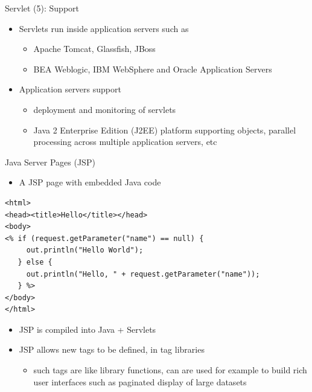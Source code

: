 \documentclass[aspectratio=169, xcolor=dvipsnames]{beamer}
\begin{document}
\begin{frame}{Servlet (5): Support}
    \begin{itemize}[<+->]
        \item Servlets run inside application servers such as
        \begin{itemize}
            \item[$\triangleright$] Apache Tomcat, Glassfish, JBoss
            \item[$\triangleright$] BEA Weblogic, IBM WebSphere and Oracle Application Servers
        \end{itemize}
        \item Application servers support
        \begin{itemize}
            \item[$\triangleright$] deployment and monitoring of servlets
            \item[$\triangleright$] Java 2 Enterprise Edition (J2EE) platform supporting objects, parallel processing across multiple application servers, etc
        \end{itemize}
    \end{itemize}
\end{frame}

\begin{frame}[fragile]{Java Server Pages (JSP)}
    \begin{itemize}
        \item A JSP page with embedded Java code
    \end{itemize}
    \begin{verbatim}
<html>
<head><title>Hello</title></head>
<body>
<% if (request.getParameter("name") == null) {
     out.println("Hello World");
   } else {
     out.println("Hello, " + request.getParameter("name"));
   } %>
</body>
</html>
    \end{verbatim}
    \begin{itemize}
        \item JSP is compiled into Java + Servlets
        \item JSP allows new tags to be defined, in tag libraries
        \begin{itemize}
            \item such tags are like library functions, can are used for example to build rich user interfaces such as paginated display of large datasets
        \end{itemize}
    \end{itemize}
\end{frame}
\end{document}
